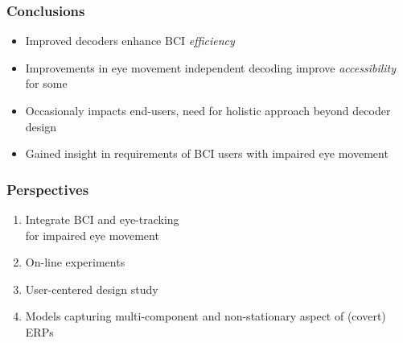 \documentclass{kul-ulille-beamer}
\begin{document}
\begin{frame}
    \frametitle{Conclusions}
    \begin{changemargin}
    \begin{itemize}
      \item Improved decoders enhance BCI \emph{efficiency}
      \bigskip
      \item Improvements in eye movement independent decoding improve
        \emph{accessibility} for some
      \bigskip
      \item Occasionaly impacts end-users, need for holistic approach beyond
        decoder design
      \bigskip
      \item Gained insight in requirements of BCI users with impaired eye movement
    \end{itemize}
  \end{changemargin}
\end{frame}

\begin{frame}
  \frametitle{Perspectives}
  \begin{changemargin}
    \begin{enumerate}
     \item Integrate BCI and eye-tracking \\ for impaired eye movement
     \bigskip
     \item On-line experiments
     \bigskip
     \item User-centered design study
     \bigskip
     \item Models capturing multi-component and
       non-stationary aspect of (covert) ERPs
  \end{enumerate}
  \end{changemargin}
\end{frame}

%
\end{document}
